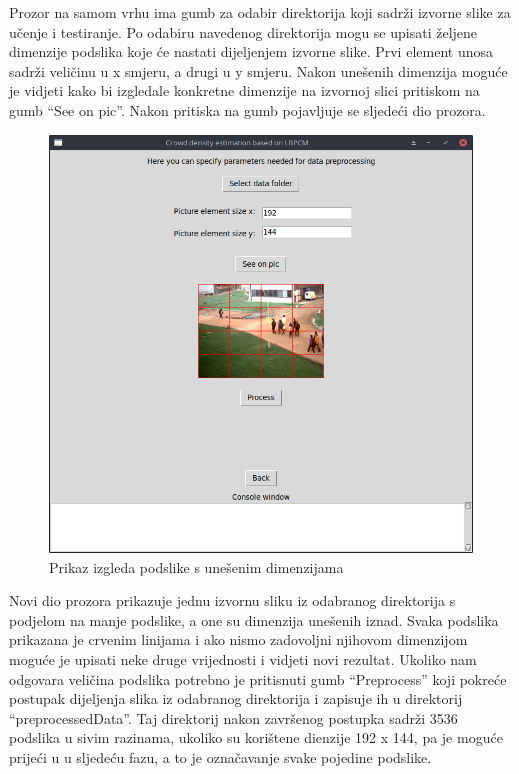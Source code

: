 \documentclass[times, utf8, zavrsni, numeric]{fer}
\begin{document}
\bigbreak

Prozor na samom vrhu ima gumb za odabir direktorija koji sadrži izvorne slike
za učenje i testiranje. Po odabiru navedenog direktorija mogu se upisati 
željene dimenzije podslika koje će nastati dijeljenjem izvorne slike.
Prvi element unosa sadrži veličinu u x smjeru, a drugi u y smjeru. Nakon
unešenih dimenzija moguće je vidjeti kako bi izgledale konkretne dimenzije
na izvornoj slici pritiskom na gumb \enquote{See on pic}. Nakon pritiska na gumb
pojavljuje se sljedeći dio prozora.

\begin{figure}[!ht]
\centering
\includegraphics[scale=0.37]{img/seeonpic.png}
\caption{Prikaz izgleda podslike s unešenim dimenzijama}
\end{figure}

\bigbreak

Novi dio prozora prikazuje jednu izvornu sliku iz odabranog direktorija
s podjelom na manje podslike, a one su dimenzija unešenih iznad. Svaka podslika
prikazana je crvenim linijama i ako nismo zadovoljni njihovom dimenzijom
moguće je upisati neke druge vrijednosti i vidjeti novi rezultat. Ukoliko 
nam odgovara veličina podslika potrebno je pritisnuti gumb \enquote{Preprocess}
koji pokreće postupak dijeljenja slika iz odabranog direktorija i zapisuje ih u 
direktorij \enquote{preprocessedData}. Taj direktorij nakon završenog postupka
sadrži 3536 podslika u sivim razinama, ukoliko su korištene dienzije 192 x 144, 
pa je moguće prijeći u u sljedeću fazu, a to je označavanje svake pojedine podslike.
\end{document}

